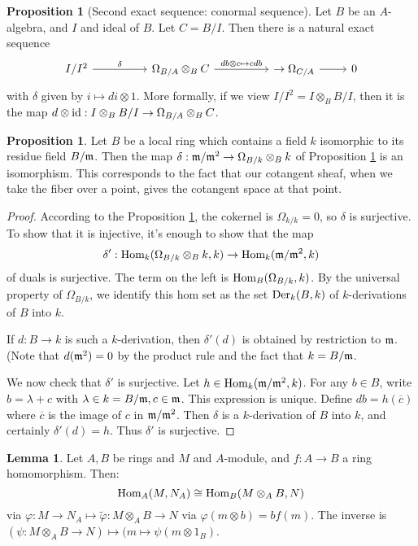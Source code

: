 \documentclass[10pt,reqno]{amsart}
\theoremstyle{definition}
\newtheorem{proposition}[theorem]{Proposition}
\newtheorem{lemma}[theorem]{Lemma}
\theoremstyle{remark}
\numberwithin{equation}{section}
\numberwithin{theorem}{section}
\newcommand*{\red}{\textcolor{red}}
\newcommand{\Hom}{\textup{Hom}}
\newcommand{\mm}{\frak{m}}
\newcommand{\wt}{\widetilde}
\begin{document}
\begin{proposition}[Second exact sequence: conormal sequence]\label{prop:conormal-seq}
Let $B$ be an $A$-algebra, and $I$ and ideal of $B$. Let $C = B/I$. Then there is a natural exact sequence
\[
\begin{tikzcd}
I/I^2 \arrow[rr, "\delta"] & & \Omega_{B/A} \otimes_B C  \arrow[rr, "db \otimes c \mapsto cdb"]& &\to \Omega_{C/A} \arrow[r] & 0
\end{tikzcd}
\]
with $\delta$ given by $i \mapsto di \otimes 1$. More formally, if we view $I/I^2 =I \otimes_B B/I$, then it is the map $d \otimes \textup{id}: I \otimes_B B/I \to \Omega_{B/A} \otimes_B C$. %
\end{proposition}

\begin{proposition} Let $B$ be a local ring which contains a field $k$ isomorphic to its residue field $B/\mm$. Then the map $\delta: \mm/\mm^2 \to \Omega_{B/k} \otimes_B k$ of Proposition \ref{prop:conormal-seq} is an isomorphism. This corresponds to the fact that our cotangent sheaf, when we take the fiber over a point, gives the cotangent space at that point.
\end{proposition}
\begin{proof}
According to the Proposition \ref{prop:conormal-seq}, the cokernel is $\Omega_{k/k} = 0$, so $\delta$ is surjective. To show that it is injective, it's enough to show that the map
\[\delta': \Hom_k(\Omega_{B/k} \otimes_B k, k) \to \Hom_k(\mm/\mm^2,k)\]
of duals is surjective. The term on the left is $\Hom_B(\Omega_{B/k}, k)$. By the universal property of $\Omega_{B/k}$, we identify this hom set as the set $\textup{Der}_k(B,k)$ of $k$-derivations of $B$ into $k$.

If $d: B \to k$ is such a $k$-derivation, then $\delta'(d)$ is obtained by restriction to $\mm$. (Note that $d(\mm^2) = 0$ by the product rule and the fact that $k = B/\mm$.

We now check that $\delta'$ is surjective. Let $h \in \Hom_k(\mm/\mm^2,k)$. For any $b \in B$, write $b = \lambda + c$ with $\lambda \in k = B/\mm, c \in \mm$. This expression is unique. Define $db = h(\overline{c})$ where $\overline{c}$ is the image of $c$ in $\mm/\mm^2$. Then $\delta$ is a $k$-derivation of $B$ into $k$, and certainly $\delta'(d) = h$. Thus $\delta'$ is surjective.
\end{proof}

\begin{lemma} Let $A,B$ be rings and $M$ and $A$-module, and $f: A \to B$ a ring homomorphism. Then:
\[\Hom_A(M,N_A) \cong \Hom_B(M \otimes_A B, N)\]
via $\varphi:M \to N_A \mapsto \wt{\varphi}: M \otimes_A B \to N$ via $\varphi(m \otimes b) = bf(m)$. The inverse is $(\psi: M \otimes_A B \to N) \mapsto (m \mapsto \psi(m \otimes 1_B)$.
\end{lemma}
\end{document}
